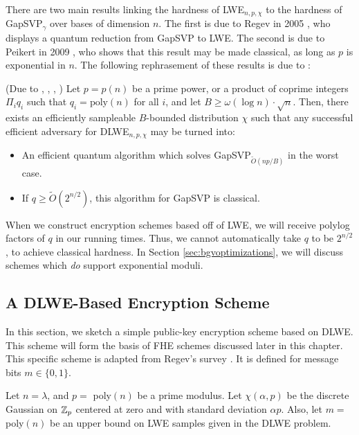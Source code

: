         There are two main results linking the hardness of LWE$_{n, p, \chi}$ to the hardness of GapSVP$_\gamma$ over bases of dimension $n$. The first is due to Regev in 2005 \cite{regev2005}, who displays a quantum reduction from GapSVP to LWE. The second is due to Peikert in 2009 \cite{Peikert09}, who shows that this result may be made classical, as long as $p$ is exponential in $n$. The following rephrasement of these results is due to \cite{b12}:

        \begin{theorem} \label{theorem:lwehardness}(Due to \cite{regev2005}, \cite{Peikert09}, \cite{MM2011}, \cite{MP12})
            Let $p = p(n)$ be a prime power, or a product of coprime integers $\Pi_i q_i$ such that $q_i = \text{poly}(n)$ for all $i$, and let $B \geq \omega(\log n) \cdot \sqrt{n}$. Then, there exists an efficiently sampleable $B$-bounded distribution $\chi$ such that any successful efficient adversary for DLWE$_{n, p, \chi}$ may be turned into:
            \begin{itemize}
                \item An efficient quantum algorithm which solves GapSVP$_{\widetilde{O}(np/B)}$ in the worst case.
                \item If $q \geq \widetilde{O}(2^{n/2})$, this algorithm for GapSVP is classical.
            \end{itemize}
        \end{theorem}

    When we construct encryption schemes based off of LWE, we will receive polylog factors of $q$ in our running times. Thus, we cannot automatically take $q$ to be $2^{n/2}$, to achieve classical hardness. In Section \ref{sec:bgvoptimizations}, we will discuss schemes which \emph{do} support exponential moduli.


    \subsection{A DLWE-Based Encryption Scheme} \label{sec:basiclweenc}
    In this section, we sketch a simple public-key encryption scheme based on DLWE. This scheme will form the basis of FHE schemes discussed later in this chapter. This specific scheme is adapted from Regev's survey \cite{regev2010learning}. It is defined for message bits $m \in \{0, 1\}$.

    Let $n = \lambda$, and $p =$ poly$(n)$ be a prime modulus. Let $\chi(\alpha, p)$ be the discrete Gaussian on $\mathbb{Z}_p$ centered at zero and with standard deviation $\alpha p$. Also, let $m = $ poly$(n)$ be an upper bound on LWE samples given in the DLWE problem.

